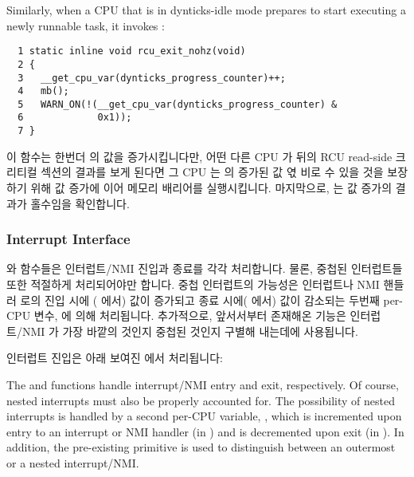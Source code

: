 Similarly, when a CPU that is in dynticks-idle mode prepares to
start executing a newly runnable task, it invokes
:
\fi

{ \scriptsize
\begin{verbatim}
  1 static inline void rcu_exit_nohz(void)
  2 {
  3   __get_cpu_var(dynticks_progress_counter)++;
  4   mb();
  5   WARN_ON(!(__get_cpu_var(dynticks_progress_counter) &
  6             0x1));
  7 }
\end{verbatim}
}

이 함수는 한번더  의 값을 증가시킵니다만, 어떤
다른 CPU 가 뒤의 RCU read-side 크리티컬 섹션의 결과를 보게 된다면 그 CPU 는
 의 증가된 값 엯 비로 수 있을 것을 보장하기 위해
값 증가에 이어 메모리 배리어를 실행시킵니다.
마지막으로,  는 값 증가의 결과가 홀수임을 확인합니다.
\iffalse

This function again increments \co{dynticks_progress_counter},
but follows it with a memory barrier to ensure that if any other CPU
sees the result of any subsequent RCU read-side critical section,
then that other CPU will also see the incremented value of
\co{dynticks_progress_counter}.
Finally, \co{rcu_exit_nohz()} checks that the result of the
increment is an odd value.

The \co{rcu_enter_nohz()} and \co{rcu_exit_nohz()}
functions handle the case where a CPU enters and exits dynticks-idle
mode due to task execution, but does not handle interrupts, which are
covered in the following section.
\fi

\subsubsection{Interrupt Interface}
\label{sec:formal:Interrupt Interface}

 와  함수들은 인터럽트/NMI 진입과 종료를
각각 처리합니다.
물론, 중첩된 인터럽트들 또한 적절하게 처리되어야만 합니다.
중첩 인터럽트의 가능성은 인터럽트나 NMI 핸들러 로의 진입 시에
( 에서) 값이 증가되고 종료 시에( 에서)
값이 감소되는 두번째 per-CPU 변수,  에 의해 처리됩니다.
추가적으로, 앞서서부터 존재해온  기능은 인터럽트/NMI 가 가장
바깥의 것인지 중첩된 것인지 구별해 내는데에 사용됩니다.

인터럽트 진입은 아래 보여진  에서 처리됩니다:
\iffalse

The  and 
functions handle interrupt/NMI entry and exit, respectively.
Of course, nested interrupts must also be properly accounted for.
The possibility of nested interrupts is handled by a second per-CPU
variable, , which is incremented upon
entry to an interrupt or NMI handler (in )
and is decremented upon exit (in ).
In addition, the pre-existing  primitive is
used to distinguish between an outermost or a nested interrupt/NMI.

